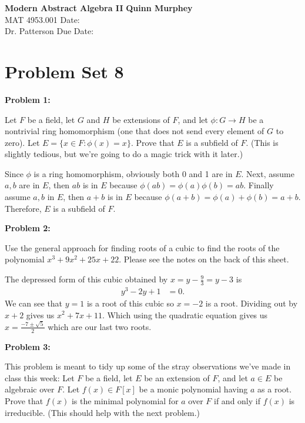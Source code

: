 \documentclass[letter paper, 12pt]{article}
\begin{document}
\noindent
\large\textbf{Modern Abstract Algebra II} \hfill \textbf{Quinn Murphey} \\
\normalsize MAT 4953.001 \hfill Date:  \\
Dr. Patterson \hfill Due Date:  \\
\noindent\makebox[\linewidth]{\rule{\paperwidth}{0.4pt}}

\section*{Problem Set 8}
\doublespacing
\noindent\textbf{Problem 1:}
    
    Let $F$ be a field, let $G$ and $H$ be extensions of $F$, and let $\phi:G\rightarrow H$ be a nontrivial ring homomorphism (one that does not send every element of $G$ to zero). Let $E = \{x \in F : \phi(x) = x\}$. Prove that $E$ is a subfield of $F$. (This is slightly tedious, but we're going to do a magic trick with it later.)
    
    Since $\phi$ is a ring homomorphism, obviously both 0 and 1 are in $E$. Next, assume $a,b$ are in $E$, then $ab$ is in $E$ because $\phi(ab)=\phi(a)\phi(b)=ab$. Finally assume $a,b$ in $E$, then $a+b$ is in $E$ because $\phi(a+b) = \phi(a) + \phi(b) = a+b$. Therefore, $E$ is a subfield of $F$.
    
\noindent\textbf{Problem 2:}
    
    Use the general approach for finding roots of a cubic to find the roots of the polynomial $x^3 + 9x^2 + 25x + 22$. Please see the notes on the back of this sheet.
    
    The depressed form of this cubic obtained by $ x=y-\frac{9}{3}=y-3$ is 
    \begin{align*}
        y^3 - 2y + 1 &= 0.
    \end{align*}
    We can see that $y=1$ is a root of this cubic so $x=-2$ is a root. Dividing out by $x+2$ gives us 
    $x^2 + 7x + 11$. Which using the quadratic equation gives us $x = \frac{-7\pm\sqrt{5}}{2}$ which are our last two roots.
    \newpage
    
\noindent\textbf{Problem 3:}
    
    This problem is meant to tidy up some of the stray observations we've made in class this week: Let $F$ be a field, let $E$ be an extension of $F$, and let $a \in E$ be algebraic over $F$. Let $f(x) \in F[x]$ be a monic polynomial having $a$ as a root. Prove that $f(x)$ is the minimal polynomial for $a$ over $F$ if and only if $f(x)$ is irreducible. (This should help with the next problem.)
    
\end{document}

